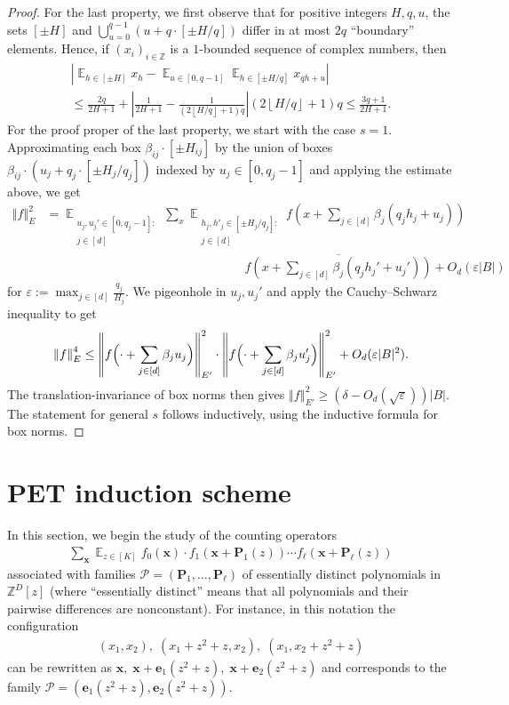 \documentclass[11pt]{amsart}
\theoremstyle{definition}
\DeclareMathOperator*{\E}{\mathbb{E}}
\newcommand{\Z}{{\mathbb Z}}
\newcommand{\CP}{{\mathcal P}}
\newcommand{\be}{{\mathbf{e}}}
\newcommand{\p}{{\mathbf{P}}}
\newcommand{\bx}{{\mathbf{x}}}
\newcommand{\norm}[1]{\left\Vert #1\right\Vert}
\newcommand{\veps}{\varepsilon}
\newcommand{\abs}[1]{\mathopen{}\left| #1\mathclose{}\right|}
\newcommand{\brac}[1]{\mathopen{}\left( #1 \mathclose{}\right)}
\newcommand{\Bigbrac}[1]{\Bigl( #1 \Bigr)}
\newcommand{\floor}[1]{\left \lfloor #1 \right \rfloor}
\begin{document}
\begin{proof}
    For the last property, we first observe that for  positive integers $H, q, u$, the sets $[\pm H]$ and $\bigcup\limits_{u=0}^{q-1}(u+q\cdot[\pm H/q])$ differ in at most $2q$ ``boundary'' elements. Hence, if $(x_i)_{i \in \mathbb{Z}}$ is a $1$-bounded sequence of complex numbers, then
    \begin{multline*}
        \abs{\E_{h\in[\pm H]} x_h - \E_{u\in[0,q-1]}\E_{h\in[\pm H/q]} x_{qh + u}}\\
        \leq \frac{2q}{2H+1}+ \abs{\frac{1}{2H+1}-\frac{1}{(2\floor{H/q}+1)q}}(2\floor{H/q}+1)q \leq \frac{3q+1}{2H+1}.
    \end{multline*}
    For the proof proper of the last property, we start with the case $s=1$.
    Approximating each box $\beta_{ij}\cdot[\pm H_{ij}]$ by the union of boxes $\beta_{ij}\cdot(u_j+q_j\cdot[\pm H_j/q_j])$ indexed by $u_j\in[0,q_j-1]$ and applying the estimate above, we get
    \begin{align*}
        \norm{f}_E^2
        &= \E_{\substack{u_j,u_j'\in[0, q_j-1]:\\ j\in[d]}}\sum_x \E_{\substack{h_j, h'_j\in [\pm H_j/q_j]:\\ {j\in[d]}}} f\brac{x+\sum_{j\in [d]}\beta_j (q_j h_j+u_j)}\\
        &\qquad\qquad\qquad\qquad\qquad\qquad\qquad\qquad\overline{f\brac{x+\sum_{j\in [d]}\beta_j (q_j h_j'+u_j')}}+O_d(\veps|B|)
    \end{align*}
    for $\veps := \max_{j\in[d]}\frac{q_j}{H_j}$.
  We pigeonhole in $u_j, u_j'$ and apply
    the Cauchy--Schwarz inequality to get
    \begin{align*}
        \norm{f}_E^4 \leq \norm{f\Bigbrac{\cdot +\sum_{j\in [d]}\beta_j u_j }}_{E'}^2\cdot \norm{f\Bigbrac{\cdot +\sum_{j\in [d]}\beta_j u_j'}}_{E'}^2 + O_d(\veps|B|^2).
    \end{align*}
    The translation-invariance of box norms then gives $\norm{{f}}_{E'}^2\geq (\delta-O_d(\sqrt{\veps}))|B|$.  The statement for general $s$ follows inductively, using the inductive formula for box norms.
\end{proof}


\section{PET induction scheme}\label{S: PET}
In this section, we begin the study of the counting operators
\begin{align}\label{E: counting operator}
	\sum_{\bx}\E_{z\in[K]} f_0(\bx)\cdot f_1(\bx+\p_1(z))\cdots f_\ell(\bx+\p_\ell(z))
\end{align}
associated with families $\CP = (\p_1, \ldots, \p_\ell)$ of essentially distinct polynomials in $\Z^D[z]$ (where ``essentially distinct'' means that all polynomials and their pairwise differences are nonconstant). For instance, in this notation the configuration
      \begin{align*}
          (x_1, x_2),\; (x_1 + z^2+z, x_2),\; (x_1, x_2+z^2+z)
      \end{align*}
      can be rewritten as $\bx,\; \bx+\be_1 (z^2+z),\; \bx + \be_2 (z^2+z)$ and corresponds to the family $\CP = (\be_1 (z^2+z), \be_2 (z^2+z))$.
\end{document}
